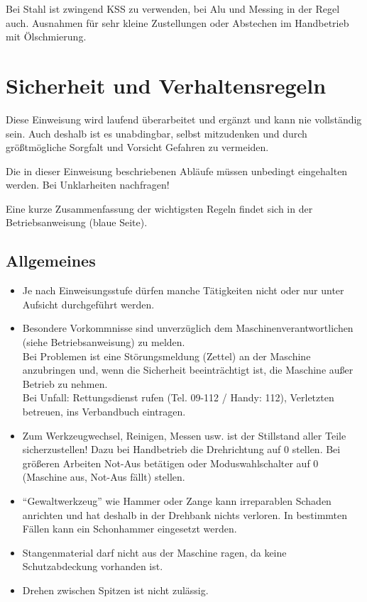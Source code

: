 \documentclass{\basedir/fablab-document}
\begin{document}
Bei Stahl ist zwingend KSS zu verwenden, bei Alu und Messing in der Regel auch. Ausnahmen für sehr kleine Zustellungen oder Abstechen im Handbetrieb mit Ölschmierung.



\newpage
\section{Sicherheit und Verhaltensregeln}

Diese Einweisung wird laufend überarbeitet und ergänzt und kann nie vollständig sein. Auch deshalb ist es unabdingbar, selbst mitzudenken und durch größtmögliche Sorgfalt und Vorsicht Gefahren zu vermeiden.

Die in dieser Einweisung beschriebenen Abläufe müssen unbedingt eingehalten werden. Bei Unklarheiten nachfragen!

Eine kurze Zusammenfassung der wichtigsten Regeln findet sich in der Betriebsanweisung (blaue Seite).

\subsection{Allgemeines}
\begin{itemize}
	\item Je nach Einweisungsstufe dürfen manche Tätigkeiten nicht oder nur unter Aufsicht durchgeführt werden.
	\item Besondere Vorkommnisse sind unverzüglich dem Maschinenverantwortlichen (siehe Betriebsanweisung) zu melden.\\
Bei Problemen ist eine Störungsmeldung (Zettel) an der Maschine anzubringen und, wenn die Sicherheit beeinträchtigt ist, die Maschine außer Betrieb zu nehmen.\\
Bei Unfall: Rettungsdienst rufen (Tel. 09-112 / Handy: 112), Verletzten betreuen, ins Verbandbuch eintragen.
	\item Zum Werkzeugwechsel, Reinigen, Messen usw. ist der Stillstand aller Teile sicherzustellen! Dazu bei Handbetrieb die Drehrichtung auf 0 stellen. Bei größeren Arbeiten Not-Aus betätigen oder Moduswahlschalter auf 0 (Maschine aus, Not-Aus fällt) stellen.
	\item \enquote{Gewaltwerkzeug} wie Hammer oder Zange kann irreparablen Schaden anrichten und hat deshalb in der Drehbank nichts verloren. In bestimmten Fällen kann ein Schonhammer eingesetzt werden. %
	\item Stangenmaterial darf nicht aus der Maschine ragen, da keine Schutzabdeckung vorhanden ist. %
	\item Drehen zwischen Spitzen ist nicht zulässig. %
\end{itemize}
\end{document}
